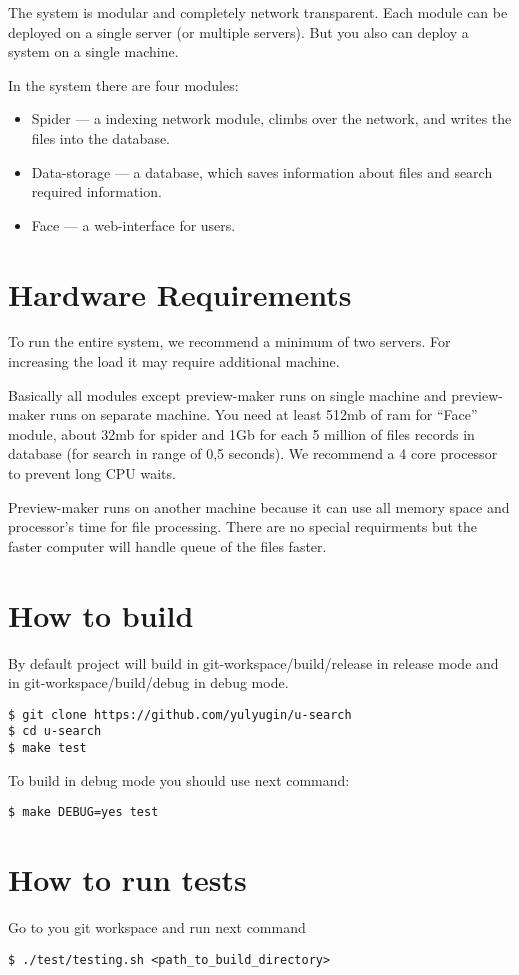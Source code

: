\documentclass[10pt, oneside, a4paper]{scrbook}
\begin{document}
The system is modular and completely network transparent. Each module can be deployed on a single server (or multiple servers). But you also can deploy a system on a single machine.

In the system there are four modules:

\begin{itemize}
  \item Spider --- a indexing network module, climbs over the network, and writes the files into the database.
  \item Data-storage --- a database, which saves information about files and search required information.
  \item Face --- a web-interface for users.
\end{itemize}


\section{Hardware Requirements}
To run the entire system, we recommend a minimum of two servers. For increasing the load it may require additional machine.

Basically all modules except preview-maker runs on single machine and preview-maker runs on separate machine. You need at least 512mb of ram for ``Face'' module, about 32mb for spider and 1Gb for each 5 million of files records in database (for search in range of 0,5 seconds). We recommend a 4 core processor to prevent long CPU waits.

Preview-maker runs on another machine because it can use all memory space and processor's time for file processing. There are no special requirments but the faster computer will handle queue of the files faster.

\section{How to build}\label{sec:build}

By default project will build in git-workspace/build/release in release mode and in git-workspace/build/debug in debug mode.

\begin{lstlisting}
$ git clone https://github.com/yulyugin/u-search
$ cd u-search
$ make test
\end{lstlisting}

To build in debug mode you should use next command:

\begin{lstlisting}
$ make DEBUG=yes test
\end{lstlisting}

\section{How to run tests}\label{sec:tests}

Go to you git workspace and run next command

\begin{lstlisting}
$ ./test/testing.sh <path_to_build_directory>
\end{lstlisting}
\end{document}
